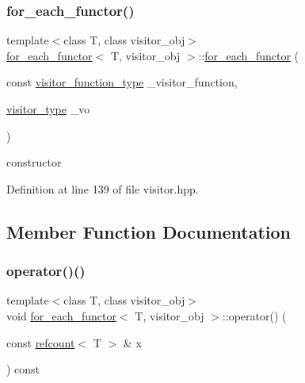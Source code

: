 \subsubsection{\texorpdfstring{for\+\_\+each\+\_\+functor()}{for\_each\_functor()}}
{\footnotesize\ttfamily template$<$class T, class visitor\+\_\+obj$>$ \\
\hyperlink{classfor__each__functor}{for\+\_\+each\+\_\+functor}$<$ T, visitor\+\_\+obj $>$\+::\hyperlink{classfor__each__functor}{for\+\_\+each\+\_\+functor} (\begin{DoxyParamCaption}\item[{const \hyperlink{classfor__each__functor_a959ddc30176d0364c4ceb00d09ae996b}{visitor\+\_\+function\+\_\+type}}]{\+\_\+visitor\+\_\+function,  }\item[{\hyperlink{classfor__each__functor_ad8dbe39e38c2b3c71543522a86565122}{visitor\+\_\+type}}]{\+\_\+vo }\end{DoxyParamCaption})\hspace{0.3cm}{\ttfamily [inline]}}



constructor 



Definition at line 139 of file visitor.\+hpp.



\subsection{Member Function Documentation}
\mbox{\label{classfor__each__functor_a6e3884dc44022d03e574ceedf93fc266}} 
\subsubsection{\texorpdfstring{operator()()}{operator()()}}
{\footnotesize\ttfamily template$<$class T, class visitor\+\_\+obj$>$ \\
void \hyperlink{classfor__each__functor}{for\+\_\+each\+\_\+functor}$<$ T, visitor\+\_\+obj $>$\+::operator() (\begin{DoxyParamCaption}\item[{const \hyperlink{structrefcount}{refcount}$<$ T $>$ \&}]{x }\end{DoxyParamCaption}) const\hspace{0.3cm}{\ttfamily [inline]}}



